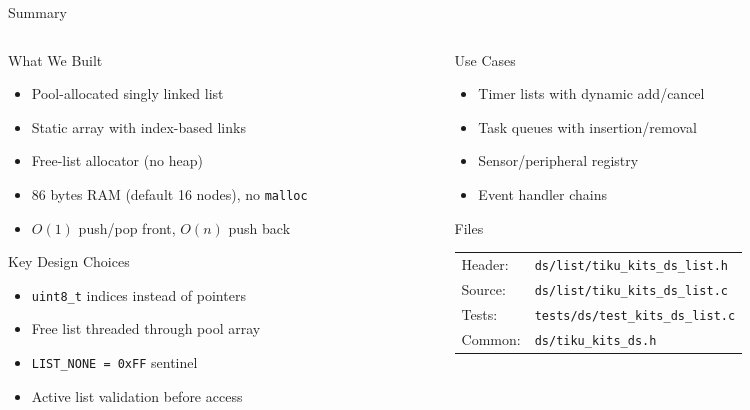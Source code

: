 \documentclass[aspectratio=169, 10pt]{beamer}
\begin{document}
\begin{frame}{Summary}
\begin{columns}[T]
\begin{column}{0.48\textwidth}
\begin{block}{What We Built}
\begin{itemize}
  \item Pool-allocated singly linked list
  \item Static array with index-based links
  \item Free-list allocator (no heap)
  \item 86 bytes RAM (default 16 nodes), no \texttt{malloc}
  \item $O(1)$ push/pop front, $O(n)$ push back
\end{itemize}
\end{block}

\begin{block}{Key Design Choices}
\begin{itemize}
  \item \texttt{uint8\_t} indices instead of pointers
  \item Free list threaded through pool array
  \item \texttt{LIST\_NONE = 0xFF} sentinel
  \item Active list validation before access
\end{itemize}
\end{block}
\end{column}

\begin{column}{0.48\textwidth}
\begin{block}{Use Cases}
\begin{itemize}
  \item Timer lists with dynamic add/cancel
  \item Task queues with insertion/removal
  \item Sensor/peripheral registry
  \item Event handler chains
\end{itemize}
\end{block}

\begin{block}{Files}
\scriptsize
\begin{tabular}{@{}lp{4.5cm}@{}}
Header: & \texttt{ds/list/tiku\_kits\_ds\_list.h} \\
Source: & \texttt{ds/list/tiku\_kits\_ds\_list.c} \\
Tests: & \texttt{tests/ds/test\_kits\_ds\_list.c} \\
Common: & \texttt{ds/tiku\_kits\_ds.h} \\
\end{tabular}
\end{block}
\end{column}
\end{columns}
\end{frame}
\end{document}
